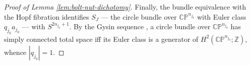 \documentclass[11pt]{amsart}
\theoremstyle{plain}
\numberwithin{equation}{section}
\theoremstyle{definition}
\theoremstyle{remark}
\newtheorem*{remarkx}{Remark}
\begin{document}
\begin{proof}[Proof of Lemma \ref{lem:bolt-nut-dichotomy}]
Finally, the bundle equivalence with the Hopf fibration
identifies $S_J$ --- the circle bundle over $\mathbb{CP}^{n_{j_0}}$ with Euler
class $q_{j_0} a_{j_0}$ --- with $S^{2 n_{j_0} + 1}$. By the Gysin sequence
\cite[\S 12]{MilnorStasheff}, a circle bundle over $\mathbb{CP}^{n_{j_0}}$ has
simply connected total space iff its Euler class is a generator of
$H^2(\mathbb{CP}^{n_{j_0}}; \mathbb{Z})$, whence $|q_{j_0}| = 1$. %
\end{proof}
\end{document}
